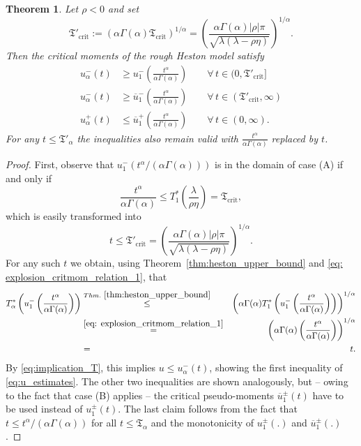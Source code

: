 \documentclass[12pt,a4paper]{amsart}
\numberwithin{equation}{section}
\numberwithin{equation}{section}
\newtheorem{theorem}{Theorem}[section]
\theoremstyle{nonumberplain}
\begin{document}
\begin{theorem}\label{thm:crit_mom_bound}Let $\rho <0$ and set 
\begin{equation}\label{eq:Tcrit_prime}
\mathfrak{T}'_\text{crit} := (\alpha \Gamma(\alpha) \mathfrak{T}_\text{crit} )^{1/\alpha} = \left(\frac{\alpha \Gamma(\alpha) |\rho| \pi}{\sqrt{\lambda(\lambda - \rho \eta)}}\right)^{1/\alpha}.
\end{equation}
Then the critical moments of the rough Heston model satisfy
\begin{subequations}\label{eq:u_estimates}
\begin{align}
u_\alpha^-(t) &\ge u_1^-\left(\frac{t^{\alpha}}{\alpha \Gamma(\alpha)} \right) \qquad \forall\, t \in (0, \mathfrak{T}'_\text{crit}] \label{eq:u_estimate_a}\\
u_\alpha^-(t) &\ge \overline u_1^-\left(\frac{t^{\alpha}}{\alpha \Gamma(\alpha)} \right) \qquad \forall\, t \in (\mathfrak{T}'_\text{crit},\infty)\\
u_\alpha^+(t) &\le \overline u_1^+\left(\frac{t^{\alpha}}{\alpha \Gamma(\alpha)} \right) \qquad \forall\, t \in (0,\infty).
\end{align}
\end{subequations}
For any $t \le \mathfrak{T}'_\alpha$ the inequalities also remain valid with $\tfrac{t^{\alpha}}{\alpha \Gamma(\alpha)}$ replaced by $t$.
 \end{theorem}
 \begin{proof}
First, observe that $u_1^-(t^\alpha/(\alpha \Gamma(\alpha)))$ is in the domain of case (A) if and only if 
\[\frac{t^\alpha}{\alpha \Gamma(\alpha)} \le T_1^*\left(\frac{\lambda}{\rho \eta}\right) = \mathfrak{T}_\text{crit},\]
which is easily transformed into
\[t \le \mathfrak{T}'_\text{crit} = \left(\frac{\alpha \Gamma(\alpha) |\rho| \pi}{\sqrt{\lambda(\lambda - \rho \eta)}}\right)^{1/\alpha}.\]
For any such $t$ we obtain, using Theorem~\ref{thm:heston_upper_bound} and \eqref{eq: explosion_critmom_relation_1}, that
 \begin{eqnarray*}
 	T_{\alpha}^*\left(u_1^-\left(\frac{t^{\alpha}}{\alpha \Gamma(\alpha)} \right)\right) &\overset{Thm.~\ref{thm:heston_upper_bound}}{\underset{\text{}}{\le}}&  \left(\alpha \Gamma(\alpha) T_1^*\left(u_1^-\left(\frac{t^{\alpha}}{\alpha \Gamma(\alpha)} \right)\right)\right)^{1/\alpha} \\
 	&\overset{\eqref{eq: explosion_critmom_relation_1}}{\underset{\text{}}{=}}& \left(\alpha \Gamma(\alpha) \left( \frac{t^{\alpha}}{\alpha \Gamma(\alpha)} \right) \right)^{1/ \alpha} \\
 	&=& t.
 \end{eqnarray*}
 By \eqref{eq:implication_T}, this implies $u \le u_\alpha^-(t)$, showing the first inequality of \eqref{eq:u_estimates}. The other two inequalities are shown analogously, but  -- owing to the fact that case (B) applies -- the critical pseudo-moments $\overline u_1^\pm(t)$ have to be used instead of $u_1^\pm(t)$. The last claim follows from the fact that $t \le t^\alpha/(\alpha \Gamma(\alpha))$ for all $t \le \mathfrak{T}_\alpha$ and the monotonicity of $u_1^\pm(.)$ and $\overline u_1^\pm(.)$.
 \end{proof}
\end{document}
